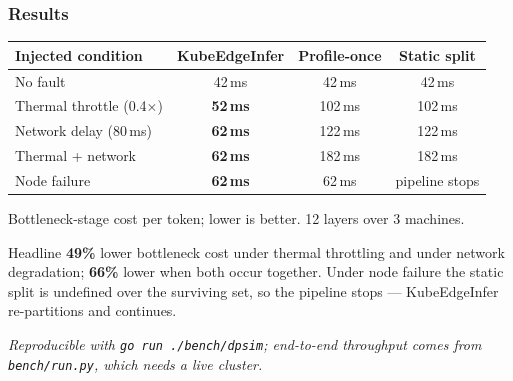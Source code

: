 \documentclass[aspectratio=169,11pt]{beamer}
\begin{document}
\begin{frame}
  \frametitle{Results}
  \centering
  {\small
  \renewcommand{\arraystretch}{1.15}
  \begin{tabular}{@{}lccc@{}}
    \toprule
    \textbf{Injected condition} & \textbf{KubeEdgeInfer} &
      \textbf{Profile-once} & \textbf{Static split}\\
    \midrule
    No fault                 & 42\,ms & 42\,ms  & 42\,ms\\
    Thermal throttle (0.4$\times$) & \textbf{52\,ms} & 102\,ms & 102\,ms\\
    Network delay (80\,ms)   & \textbf{62\,ms} & 122\,ms & 122\,ms\\
    Thermal + network        & \textbf{62\,ms} & 182\,ms & 182\,ms\\
    Node failure             & \textbf{62\,ms} & 62\,ms  & pipeline stops\\
    \bottomrule
  \end{tabular}}
  \par\vspace{0.3em}
  {\scriptsize Bottleneck-stage cost per token; lower is better.
   12 layers over 3 machines.}
  \vfill
  \begin{block}{\normalsize Headline}
    \small\textbf{49\%} lower bottleneck cost under thermal throttling and under
    network degradation; \textbf{66\%} lower when both occur together. Under
    node failure the static split is undefined over the surviving set, so the
    pipeline stops --- KubeEdgeInfer re-partitions and continues.
  \end{block}
  \vspace{0.25em}
  {\scriptsize\itshape Reproducible with \texttt{go run ./bench/dpsim}; end-to-end
   throughput comes from \texttt{bench/run.py}, which needs a live cluster.}
\end{frame}
\end{document}
